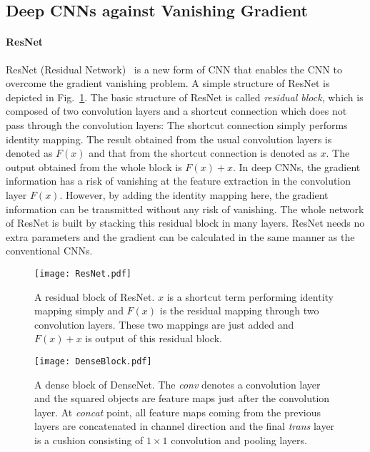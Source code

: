 \documentclass[journal]{IEEEtran}
\begin{document}
\subsection{Deep CNNs against Vanishing Gradient}
\paragraph*{\textbf{ResNet}}
ResNet (Residual Network)~\cite{He2017} is a new form of CNN that enables the CNN to overcome the gradient vanishing problem.
A simple structure of ResNet is depicted in Fig.~\ref{fig:ResNet}.
The basic structure of ResNet is called \emph{residual block}, which is composed of two convolution layers and a shortcut connection which does not pass through the convolution layers: The shortcut connection simply performs identity mapping.
The result obtained from the usual convolution layers is denoted as $F(x)$ and that from the shortcut connection is denoted as $x$.
The output obtained from the whole block is $F(x)+x$.
In deep CNNs, the gradient information has a risk of vanishing at the feature extraction in the convolution layer $F(x)$.
However, by adding the identity mapping here, the gradient information can be transmitted without any risk of vanishing.
The whole network of ResNet is built by stacking this residual block in many layers.
ResNet needs no extra parameters and the gradient can be calculated in the same manner as the conventional CNNs.

\begin{figure}[!t]
\centering
\texttt{[image: ResNet.pdf]}
\caption{A residual block of ResNet.
$x$ is a shortcut term performing identity mapping simply and $F(x)$ is the residual mapping through two convolution layers.
These two mappings are just added and $F(x)+x$ is output of this residual block.}
\label{fig:ResNet}
\end{figure}

\begin{figure}[!t]
\centering
\texttt{[image: DenseBlock.pdf]}
\vspace*{-1cm}
\caption{A dense block of DenseNet.
The \emph{conv} denotes a convolution layer and the squared objects are feature maps just after the convolution layer.
At \emph{concat} point, all feature maps coming from the previous layers are concatenated in channel direction and the final \emph{trans} layer is a cushion consisting of $1\times1$ convolution and pooling layers.
}
\label{fig:DenseBlock}
\end{figure}
\end{document}
